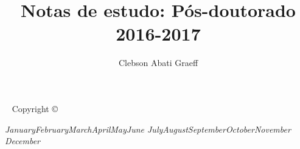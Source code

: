 \documentclass[justified,a4paper]{tufte-book}
\title{Notas de estudo: Pós-doutorado 2016-2017}
\author[Clebson Graeff]{Clebson Abati Graeff}
\newcommand{\monthyear}{%
  \ifcase\month\or January\or February\or March\or April\or May\or June\or
  July\or August\or September\or October\or November\or
  December\fi\space\number\year
}
\begin{document}
\frontmatter

\renewcommand{\maketitlepage}[0]{%
\cleardoublepage%
{%
\begin{fullwidth}%
\fontsize{18}{20}\selectfont\par\noindent\textcolor{darkgray}{\it{\thanklessauthor}}%
\vspace{11.5pc}%
\fontsize{36}{40}\selectfont\par\noindent\textcolor{darkgray}{\it{\thanklesstitle}}%
\vfill%
\fontsize{14}{16}\selectfont\par\noindent\allcaps{\thanklesspublisher}%
\end{fullwidth}%
}
\thispagestyle{empty}%
\clearpage%
}
\maketitlepage


\newpage
\begin{fullwidth}
~\vfill
\thispagestyle{empty}
\setlength{\parindent}{0pt}
\setlength{\parskip}{\baselineskip}
Copyright \copyright\ \the\year\ \thanklessauthor

\par{}

\par{}

\par\textit{\monthyear}
\end{fullwidth}

\tableofcontents

\listoffigures

\listoftables

\cleardoublepage



\mainmatter





\backmatter





\printindex
\end{document}
